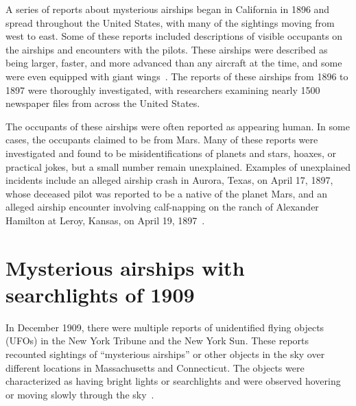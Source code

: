 A series of reports about mysterious airships began in California in 1896 and spread throughout the United States, with many of the sightings moving from west to east. Some of these reports included descriptions of visible occupants on the airships and encounters with the pilots. These airships were described as being larger, faster, and more advanced than any aircraft at the time, and some were even equipped with giant wings~\cite[p.~131,462]{Dash1997}. The reports of these airships from 1896 to 1897 were thoroughly investigated, with researchers examining nearly 1500 newspaper files from across the United States.

The occupants of these airships were often reported as appearing human. In some cases, the occupants claimed to be from Mars. Many of these reports were investigated and found to be misidentifications of planets and stars, hoaxes, or practical jokes, but a small number remain unexplained. Examples of unexplained incidents include an alleged airship crash in Aurora, Texas, on April 17, 1897, whose deceased pilot was reported to be a native of the planet Mars, and an alleged airship encounter involving calf-napping on the ranch of Alexander Hamilton at Leroy, Kansas, on April 19, 1897~\cite{Sanarov-81}.





\section{Mysterious airships with searchlights of 1909}
\label{2023-UFO-part-History-chapter-pre-1945-mawsl1909}


In December 1909, there were multiple reports of unidentified flying objects (UFOs) in the New York Tribune and the New York Sun. These reports recounted sightings of ``mysterious airships'' or other objects in the sky over different locations in Massachusetts and Connecticut. The objects were characterized as having bright lights or searchlights and were observed hovering or moving slowly through the sky~\cite[New~Lands, Chapter 15]{Fort1975-vd}.





